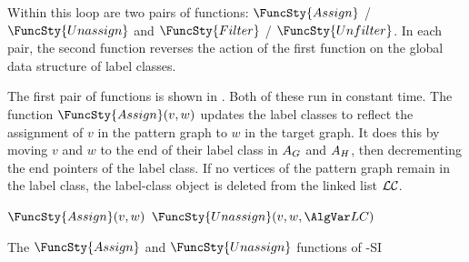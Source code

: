 Within this loop are two pairs of functions:
$\FuncSty{Assign}$ / $\FuncSty{Unassign}$
and
$\FuncSty{Filter}$ / $\FuncSty{Unfilter}$.  In each pair, the
second function reverses the action of the first function on the global
data structure of label classes.

The first pair of functions is shown in .
Both of these run in constant time.
The function $\FuncSty{Assign}(v,w)$ updates the label classes to reflect
the assignment of $v$ in the pattern graph to $w$ in the target graph.  It 
does this by moving $v$ and $w$ to the end of their label class in
$A_G$ and $A_H$, then decrementing the end pointers of the label class.
If no vertices of the pattern graph remain in the label class, the label-class
object is deleted from the linked list $\mathcal{LC}$.

\begin{algorithm}[tb]
\AlgorithmFontSize
\DontPrintSemicolon
\nl $\FuncSty{Assign}(v,w)$ \;
\nl {}
\;
\nl $\FuncSty{Unassign}(v,w,\LC)$ \;
\nl {}
\caption{The $\FuncSty{Assign}$ and $\FuncSty{Unassign}$ functions of \McSplit-SI}
\label{McSplitSIAlgAssign}
\end{algorithm}

